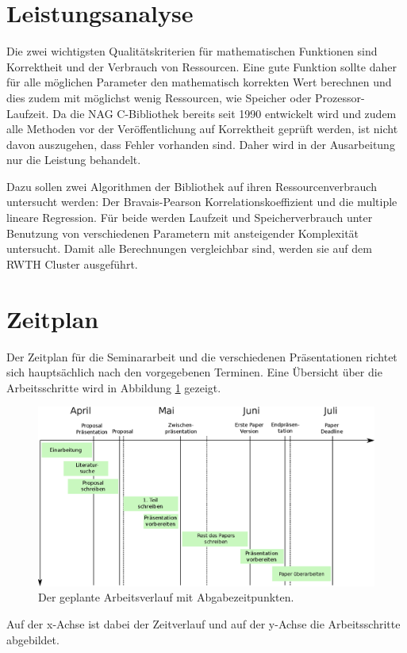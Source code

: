 \documentclass{article}
\begin{document}
\section{Leistungsanalyse}

Die zwei wichtigsten Qualitätskriterien für mathematischen Funktionen sind Korrektheit und der Verbrauch von Ressourcen.
Eine gute Funktion sollte daher für alle möglichen Parameter den mathematisch korrekten Wert berechnen und dies zudem mit möglichst wenig Ressourcen, wie Speicher oder Prozessor-Laufzeit.
Da die NAG C-Bibliothek bereits seit 1990 entwickelt wird\cite{Wikipedia:nag} und zudem alle Methoden vor der Veröffentlichung auf Korrektheit geprüft werden\cite{NAG2011}, ist nicht davon auszugehen, dass Fehler vorhanden sind.
Daher wird in der Ausarbeitung nur die Leistung behandelt.

Dazu sollen zwei Algorithmen der Bibliothek auf ihren Ressourcenverbrauch untersucht werden: Der Bravais-Pearson Korrelationskoeffizient und die multiple lineare Regression.
Für beide werden Laufzeit und Speicherverbrauch unter Benutzung von verschiedenen Parametern mit ansteigender Komplexität untersucht.
Damit alle Berechnungen vergleichbar sind, werden sie auf dem RWTH Cluster ausgeführt.

\section{Zeitplan}

Der Zeitplan für die Seminararbeit und die verschiedenen Präsentationen richtet sich hauptsächlich nach den vorgegebenen Terminen.
Eine Übersicht über die Arbeitsschritte wird in Abbildung \ref{fig:Zeitplan} gezeigt.
\begin{figure}[t]
 \includegraphics[width=\linewidth]{./figures/Workplan-adj-small.eps}
 \caption{Der geplante Arbeitsverlauf mit Abgabezeitpunkten.}
 \label{fig:Zeitplan} 
\end{figure}
Auf der x-Achse ist dabei der Zeitverlauf und auf der y-Achse die Arbeitsschritte abgebildet.
\end{document}
